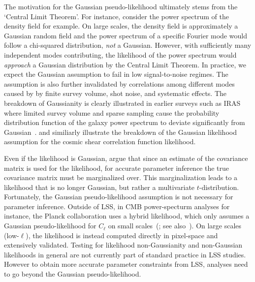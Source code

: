 \documentclass[12pt, letterpaper, preprint]{aastex}
\newcommand{\lss}{{\small{LSS}}\xspace}
\begin{document}
The motivation for the Gaussian pseudo-likelihood ultimately stems 
from the `Central Limit Theorem'. For instance, consider the power spectrum of the density 
field for example. On large scales, the density field is approximately a 
Gaussian random field and the power spectrum of a specific Fourier 
mode would follow a chi-squared distribution, \emph{not} a Gaussian. 
However, with sufficiently many independent modes contributing, the likelihood
of the power spectrum would \emph{approach} a Gaussian distribution by the Central 
Limit Theorem. In practice, we expect the Gaussian assumption 
to fail in low signal-to-noise regimes. The assumption is also further
invalidated by correlations among different modes caused by 
by finite survey volume, shot noise, and systematic effects.
The breakdown of Gaussianity is clearly illustrated in earlier 
surveys such as IRAS where limited survey volume and sparse sampling cause the 
probability distribution function of the galaxy power spectrum to deviate 
significantly from Gaussian~\citep[see Figure 9 in][]{scoccimarro2000}. 
\cite{hartlap2009} and \cite{sellentin2017} similiarly illustrate the breakdown
of the Gaussian likelihood assumption for the cosmic shear correlation function 
likelihood.

Even if the likelihood is Gaussian, \cite{sellentin2016} argue that 
since an estimate of the covariance matrix is used for the likelihood, 
for accurate parameter inference the true covariance matrix must be marginalized over. 
This marginalization leads to a likelihood that is no longer Gaussian, but rather a 
multivariate $t$-distribution. Fortunately, the Gaussian pseudo-likelihood 
assumption is not necessary for parameter inference. Outside of \lss, in CMB 
power-specturm analyses for instance, the Planck collaboration 
uses a hybrid likelihood, which only assumes a Gaussian pseudo-likelihood 
for $C_\ell$ on small scales~(\citealt{ade2014,aghanim2016}; see 
also~\citealt{efstathiou2004, efstathiou2006}). On large scales (low-$\ell$), 
the likelihood is instead computed directly in pixel-space and extensively 
validated. Testing for likelihood non-Gaussianity and non-Gaussian likelihoods 
in general are not currently part of standard practice in \lss studies. However
to obtain more accurate parameter constraints from \lss, analyses need to go beyond the 
Gaussian pseudo-likelihood.
\end{document}
